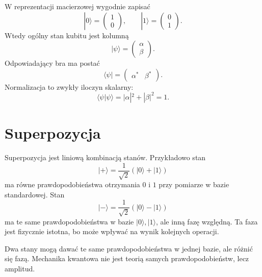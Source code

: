 W reprezentacji macierzowej wygodnie zapisać
\begin{equation}
    |0\rangle=\begin{pmatrix}1\\0\end{pmatrix},
    \qquad
    |1\rangle=\begin{pmatrix}0\\1\end{pmatrix}.
\end{equation}
Wtedy ogólny stan kubitu jest kolumną
\begin{equation}
    |\psi\rangle=\begin{pmatrix}\alpha\\\beta\end{pmatrix}.
\end{equation}
Odpowiadający bra ma postać
\begin{equation}
    \langle\psi|=\begin{pmatrix}\alpha^* & \beta^*\end{pmatrix}.
\end{equation}
Normalizacja to zwykły iloczyn skalarny:
\begin{equation}
    \langle\psi|\psi\rangle=|\alpha|^2+|\beta|^2=1.
\end{equation}

\section{Superpozycja}

Superpozycja jest liniową kombinacją stanów. Przykładowo stan
\begin{equation}
    |+\rangle=\frac{1}{\sqrt{2}}\left(|0\rangle+|1\rangle\right)
\end{equation}
ma równe prawdopodobieństwa otrzymania \(0\) i \(1\) przy pomiarze w bazie standardowej. Stan
\begin{equation}
    |-\rangle=\frac{1}{\sqrt{2}}\left(|0\rangle-|1\rangle\right)
\end{equation}
ma te same prawdopodobieństwa w bazie \(|0\rangle,|1\rangle\), ale inną fazę względną. Ta faza jest fizycznie istotna, bo może wpływać na wynik kolejnych operacji.

\begin{remarkbox}
Dwa stany mogą dawać te same prawdopodobieństwa w jednej bazie, ale różnić się fazą. Mechanika kwantowa nie jest teorią samych prawdopodobieństw, lecz amplitud.
\end{remarkbox}

